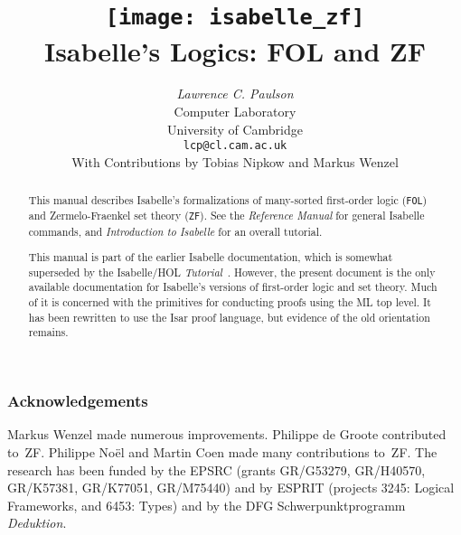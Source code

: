 \documentclass[11pt,a4paper]{report}
\title{\texttt{[image: isabelle\_zf]} \\[4ex] 
       Isabelle's Logics: FOL and ZF}
\author{{\em Lawrence C. Paulson}\\
        Computer Laboratory \\ University of Cambridge \\
        \texttt{lcp@cl.cam.ac.uk}\\[3ex] 
        With Contributions by Tobias Nipkow and Markus Wenzel}
\begin{document}
\maketitle 

\begin{abstract}
This manual describes Isabelle's formalizations of many-sorted first-order
logic (\texttt{FOL}) and Zermelo-Fraenkel set theory (\texttt{ZF}).  See the
\emph{Reference Manual} for general Isabelle commands, and \emph{Introduction
  to Isabelle} for an overall tutorial.

This manual is part of the earlier Isabelle documentation, 
which is somewhat superseded by the Isabelle/HOL
\emph{Tutorial}~\cite{isa-tutorial}. However, the present document is the
only available documentation for Isabelle's versions of first-order logic
and set theory. Much of it is concerned with 
the primitives for conducting proofs 
using the ML top level.  It has been rewritten to use the Isar proof
language, but evidence of the old \ML{} orientation remains.
\end{abstract}


\subsubsection*{Acknowledgements} 
Markus Wenzel made numerous improvements.
    Philippe de Groote contributed to~ZF.  Philippe No\"el and
    Martin Coen made many contributions to~ZF.  The research has 
    been funded by the EPSRC (grants GR/G53279, GR/H40570, GR/K57381,
    GR/K77051, GR/M75440) and by ESPRIT (projects 3245:
    Logical Frameworks, and 6453: Types) and by the DFG Schwerpunktprogramm
    \emph{Deduktion}.
    
 \tableofcontents \cleardoublepage
{} 
\setcounter{page}{1} 








\printindex
\end{document}
